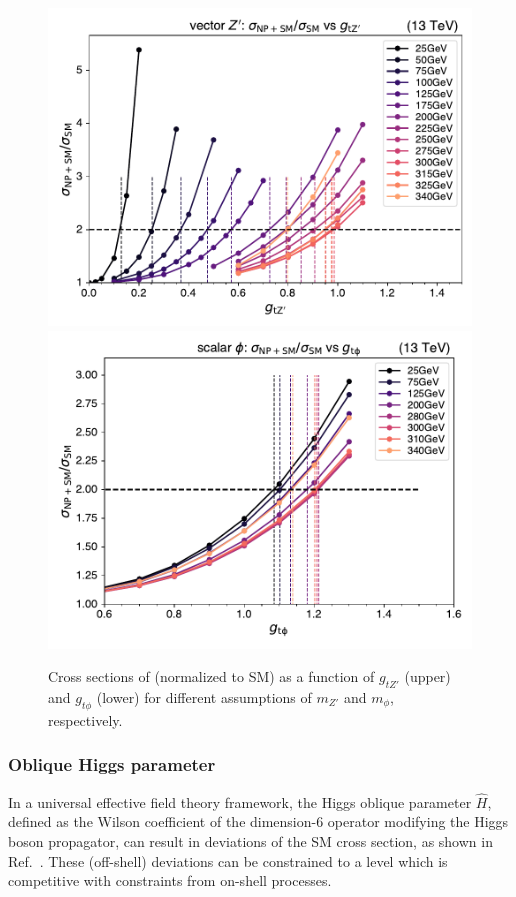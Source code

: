 \begin{figure}[!htbp]
    \centering
    \includegraphics[width=0.78\linewidth]{figs/ftan/plot_xsec_zprime.pdf} \\
    \includegraphics[width=0.78\linewidth]{figs/ftan/plot_xsec_phi.pdf}
    \caption{
        Cross sections of \tttt (normalized to SM) as a function of $g_{tZ'}$ (upper)
        and $g_{t\phi}$ (lower) for different assumptions of $m_{Z'}$ and $m_{\phi}$,
        respectively.
    }
    \label{fig:cross_section_zprimephi}
\end{figure}

\FloatBarrier

\subsubsection{Oblique Higgs parameter}

In a universal effective field theory framework, the Higgs oblique
parameter $\hat H$, defined as the Wilson coefficient of the dimension-6
operator modifying the Higgs boson propagator, can result in deviations of the
SM \tttt cross section, as shown in Ref.~\cite{THEORY:ObliqueHiggs2019}.  These
(off-shell) deviations can be constrained to a level which is competitive with
constraints from on-shell processes.

